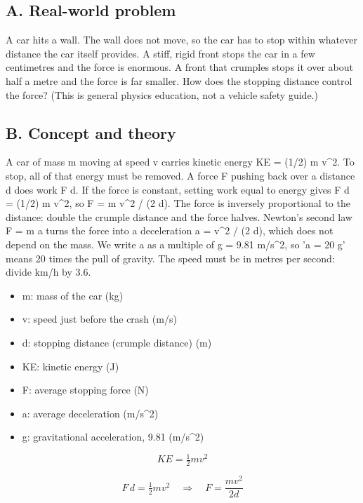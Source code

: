 \documentclass[11pt,a4paper]{article}
\begin{document}
\subsection*{A. Real-world problem}
A car hits a wall. The wall does not move, so the car has to stop within whatever distance the car itself provides. A stiff, rigid front stops the car in a few centimetres and the force is enormous. A front that crumples stops it over about half a metre and the force is far smaller. How does the stopping distance control the force? (This is general physics education, not a vehicle safety guide.)

\subsection*{B. Concept and theory}
A car of mass m moving at speed v carries kinetic energy KE = (1/2) m v\textasciicircum{}2. To stop, all of that energy must be removed. A force F pushing back over a distance d does work F d. If the force is constant, setting work equal to energy gives F d = (1/2) m v\textasciicircum{}2, so F = m v\textasciicircum{}2 / (2 d). The force is inversely proportional to the distance: double the crumple distance and the force halves. Newton's second law F = m a turns the force into a deceleration a = v\textasciicircum{}2 / (2 d), which does not depend on the mass. We write a as a multiple of g = 9.81 m/s\textasciicircum{}2, so 'a = 20 g' means 20 times the pull of gravity. The speed must be in metres per second: divide km/h by 3.6.

\begin{itemize}[nosep]
\item m: mass of the car (kg)
\item v: speed just before the crash (m/s)
\item d: stopping distance (crumple distance) (m)
\item KE: kinetic energy (J)
\item F: average stopping force (N)
\item a: average deceleration (m/s\textasciicircum{}2)
\item g: gravitational acceleration, 9.81 (m/s\textasciicircum{}2)
\end{itemize}

\begin{equation*}
KE=\tfrac12 m v^2
\end{equation*}

\begin{equation*}
F\,d=\tfrac12 m v^2\quad\Longrightarrow\quad F=\dfrac{m v^2}{2d}
\end{equation*}
\end{document}
